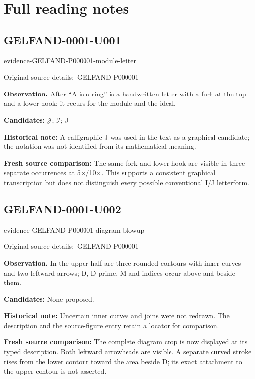 \documentclass[11pt]{article}
\newcommand{\EvidenceBlock}[4]{%
 \par\smallskip\noindent\begin{minipage}{\linewidth}
 \begin{minipage}[t]{.47\linewidth}\vspace{0pt}\centering
 \csname evidence-#1-#2\endcsname\par
 {\scriptsize\SourceCropCaption\ #1}\par
 \end{minipage}\hfill
 \begin{minipage}[t]{.49\linewidth}\vspace{0pt}\raggedright
 {\small\color{orange!65!black}\textbf{#4} #3}\par
 \end{minipage}
 \end{minipage}\par\smallskip}
\newcommand{\SourceCropCaption}{Original source details:}\newcommand{\ReadingCaption}{Uncertain reading.}\newcommand{\IncompleteCaption}{Undeciphered passage.}\newcommand{\DiagramCaption}{Diagram and typed description.}
\begin{document}
\clearpage\section*{Full reading notes}
\subsection*{GELFAND-0001-U001}
\EvidenceBlock{GELFAND-P000001}{module-letter}{After “A is a ring” is a handwritten letter with a fork at the top and a lower hook; it recurs for the module and the ideal.}{Observation.}
\par\smallskip\noindent\textbf{Candidates: } \(\mathcal{J}\); \(\mathcal{I}\); J\par
\par\smallskip\noindent\textbf{Historical note: } A calligraphic J was used in the text as a graphical candidate; the notation was not identified from its mathematical meaning.\par
\par\smallskip\noindent\textbf{Fresh source comparison: } The same fork and lower hook are visible in three separate occurrences at 5×/10×. This supports a consistent graphical transcription but does not distinguish every possible conventional I/J letterform.\par
\subsection*{GELFAND-0001-U002}
\EvidenceBlock{GELFAND-P000001}{diagram-blowup}{In the upper half are three rounded contours with inner curves and two leftward arrows; D, D-prime, M and indices occur above and beside them.}{Observation.}
\par\smallskip\noindent\textbf{Candidates: } None proposed.\par
\par\smallskip\noindent\textbf{Historical note: } Uncertain inner curves and joins were not redrawn. The description and the source-figure entry retain a locator for comparison.\par
\par\smallskip\noindent\textbf{Fresh source comparison: } The complete diagram crop is now displayed at its typed description. Both leftward arrowheads are visible. A separate curved stroke rises from the lower contour toward the area beside D; its exact attachment to the upper contour is not asserted.\par
\end{document}
